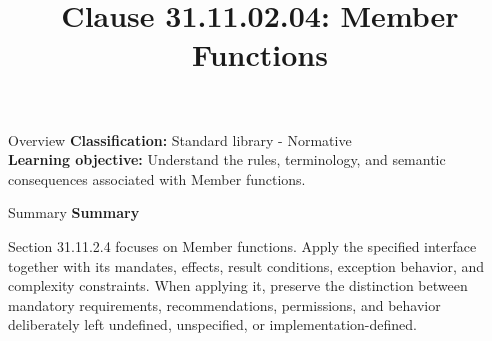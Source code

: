 \documentclass[10pt,letterpaper]{article}
\title{Clause 31.11.02.04: Member Functions}
\author{}
\date{}
\begin{document}
\maketitle
\begin{CornellOverviewBox}{Overview}
\textbf{Classification:} Standard library - Normative\\[2pt]
\textbf{Learning objective:} Understand the rules, terminology, and semantic consequences associated with Member functions.
\end{CornellOverviewBox}\begin{CornellSummaryBox}{Summary}
{\sffamily\bfseries\color{Accent} Summary}\par\vspace{3pt}Section 31.11.2.4 focuses on Member functions. Apply the specified interface together with its mandates, effects, result conditions, exception behavior, and complexity constraints. When applying it, preserve the distinction between mandatory requirements, recommendations, permissions, and behavior deliberately left undefined, unspecified, or implementation-defined.
\end{CornellSummaryBox}
\end{document}
